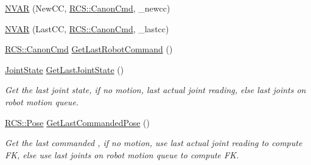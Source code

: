 \begin{DoxyCompactItemize}
\hyperlink{structRCS_1_1CController_a5113cb8a1cfaf75459e8a2b13802312e}{N\-V\-A\-R} (New\-C\-C, \hyperlink{structRCS_1_1CanonCmd}{R\-C\-S\-::\-Canon\-Cmd}, \-\_\-newcc)
\item 
\hyperlink{structRCS_1_1CController_a1b85d1d02e33dbfe25173575f17d4498}{N\-V\-A\-R} (Last\-C\-C, \hyperlink{structRCS_1_1CanonCmd}{R\-C\-S\-::\-Canon\-Cmd}, \-\_\-lastcc)
\item 
\hyperlink{structRCS_1_1CanonCmd}{R\-C\-S\-::\-Canon\-Cmd} \hyperlink{structRCS_1_1CController_af150048fb1660e68d9f5ec1043494ea9}{Get\-Last\-Robot\-Command} ()
\item 
\hyperlink{RCS_8h_aa4adb93a26caa4dacba9c9614e283245}{Joint\-State} \hyperlink{structRCS_1_1CController_a7334e3abcc69cc6e3a9f82e59c682551}{Get\-Last\-Joint\-State} ()
\begin{DoxyCompactList}\small\item\em Get the last joint state, if no motion, last actual joint reading, else last joints on robot motion queue. \end{DoxyCompactList}\item 
\hyperlink{namespaceRCS_aa07e45d8a50e30064283d2b38087f999}{R\-C\-S\-::\-Pose} \hyperlink{structRCS_1_1CController_ae7230e4ecd977fb1519b13b2ed696897}{Get\-Last\-Commanded\-Pose} ()
\begin{DoxyCompactList}\small\item\em Get the last commanded , if no motion, use last actual joint reading to compute F\-K, else use last joints on robot motion queue to compute F\-K. \end{DoxyCompactList}\end{DoxyCompactItemize}
